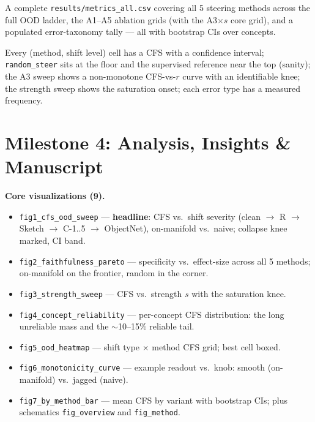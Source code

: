 \documentclass[11pt]{article}
\begin{document}
\begin{delivbox}
A complete \texttt{results/metrics\_all.csv} covering all 5 steering methods across the
full OOD ladder, the A1--A5 ablation grids (with the A3$\times s$ core grid), and a
populated error-taxonomy tally --- all with bootstrap CIs over concepts.
\end{delivbox}
\begin{checkbox}
Every (method, shift level) cell has a CFS with a confidence interval;
\texttt{random\_steer} sits at the floor and the supervised reference near the top
(sanity); the A3 sweep shows a non-monotone CFS-vs-$r$ curve with an identifiable knee;
the strength sweep shows the saturation onset; each error type has a measured frequency.
\end{checkbox}

\section{Milestone 4: Analysis, Insights \& Manuscript}

\textbf{Core visualizations (9).}
\begin{itemize}[leftmargin=1.4em,itemsep=0pt]
  \item \texttt{fig1\_cfs\_ood\_sweep} --- \textbf{headline}: CFS vs.\ shift severity
    (clean $\to$ R $\to$ Sketch $\to$ C-1..5 $\to$ ObjectNet), on-manifold vs.\ naive;
    collapse knee marked, CI band.
  \item \texttt{fig2\_faithfulness\_pareto} --- specificity vs.\ effect-size across all 5
    methods; on-manifold on the frontier, random in the corner.
  \item \texttt{fig3\_strength\_sweep} --- CFS vs.\ strength $s$ with the saturation knee.
  \item \texttt{fig4\_concept\_reliability} --- per-concept CFS distribution: the long
    unreliable mass and the $\sim$10--15\% reliable tail.
  \item \texttt{fig5\_ood\_heatmap} --- shift type $\times$ method CFS grid; best cell boxed.
  \item \texttt{fig6\_monotonicity\_curve} --- example readout vs.\ knob: smooth
    (on-manifold) vs.\ jagged (naive).
  \item \texttt{fig7\_by\_method\_bar} --- mean CFS by variant with bootstrap CIs; plus
    schematics \texttt{fig\_overview} and \texttt{fig\_method}.
\end{itemize}
\end{document}
